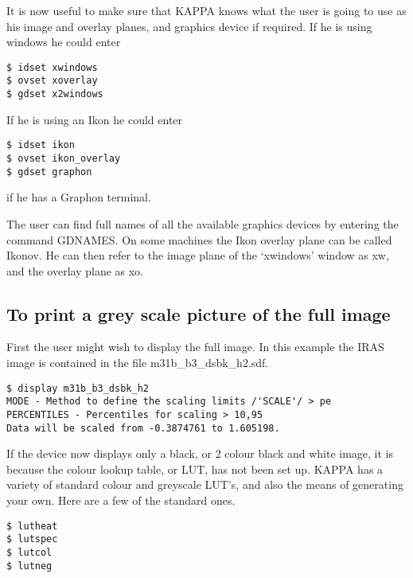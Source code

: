 \documentclass[twoside,11pt]{article}
\begin{document}
It is now useful to make sure that KAPPA knows what the user is going to use as 
his image and overlay planes, and graphics device if required. If he is using
windows he could enter
\begin{small}
\begin{verbatim}
$ idset xwindows
$ ovset xoverlay
$ gdset x2windows
\end{verbatim}
\end{small}

If he is using an Ikon he could enter
\begin{small}
\begin{verbatim}
$ idset ikon
$ ovset ikon_overlay
$ gdset graphon
\end{verbatim}
\end{small}
if he has a Graphon terminal.

The user can find full names of all the available graphics devices by entering
the command GDNAMES. On some machines the Ikon overlay plane can be called
Ikonov. He can then refer to the image plane of the `xwindows' window  as xw,
and the overlay plane as xo. 

\subsection{To print a grey scale picture of the full image}
\label{k:fullim}
First the user might wish to display the full image. In this example the IRAS
image is contained in the file m31b\_b3\_dsbk\_h2.sdf.
\begin{small}
\begin{verbatim}
$ display m31b_b3_dsbk_h2 
MODE - Method to define the scaling limits /'SCALE'/ > pe
PERCENTILES - Percentiles for scaling > 10,95
Data will be scaled from -0.3874761 to 1.605198.
\end{verbatim}
\end{small}

If the device now displays only a black, or 2 colour black and white image, it
is because the colour lookup table, or LUT, has not been set up. KAPPA has
a variety of standard colour and greyscale LUT's, and also the means of 
generating your own. Here are a few of the standard ones.

\begin{small}
\begin{verbatim}
$ lutheat
$ lutspec
$ lutcol
$ lutneg
\end{verbatim}
\end{small}
\end{document}
